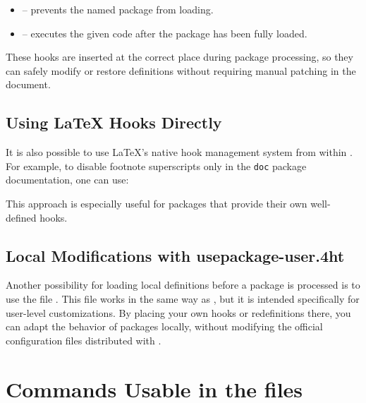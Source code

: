\begin{itemize}
  \item {} – prevents the named
    package from loading.
  \item {} – executes the given code after
    the package has been fully loaded.
\end{itemize}

These hooks are inserted at the correct place during package processing, so
they can safely modify or restore definitions without requiring manual patching
in the document.

\subsection{Using \LaTeX{} Hooks Directly}

It is also possible to use \LaTeX{}'s native hook management system from within
. For example, to disable footnote superscripts only in
the \texttt{doc} package documentation, one can use:

\begin{texsource}
\end{texsource}

This approach is especially useful for packages that provide their own
well-defined hooks.

\subsection{Local Modifications with usepackage-user.4ht}

Another possibility for loading local definitions before a package is processed
is to use the file . This file works in the same way
as , but it is intended specifically for user-level
customizations. By placing your own hooks or redefinitions there, you can
adapt the behavior of packages locally, without modifying the official
configuration files distributed with \texfourht.


\section{Commands Usable in the  files}


